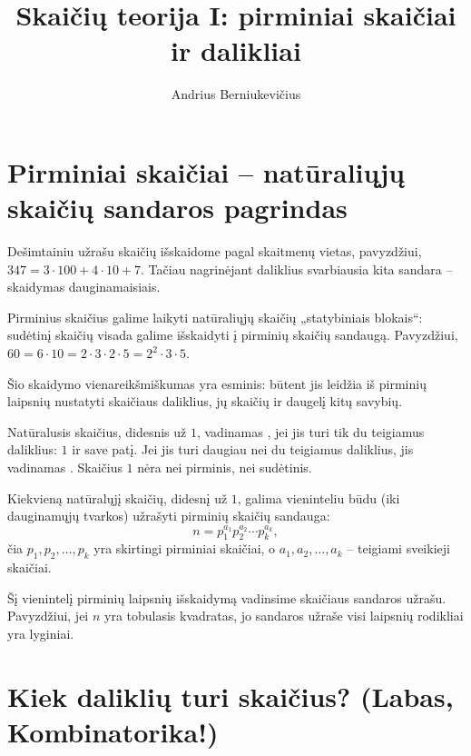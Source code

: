 \documentclass[11pt,a4paper]{scrartcl}
\title{Skaičių teorija I: pirminiai skaičiai ir dalikliai}
\author{Andrius Berniukevičius}
\begin{document}
\maketitle

\section{Pirminiai skaičiai – natūraliųjų skaičių sandaros pagrindas}

Dešimtainiu užrašu skaičių išskaidome pagal skaitmenų vietas, pavyzdžiui, $347=3\cdot100+4\cdot10+7$. Tačiau nagrinėjant daliklius svarbiausia kita sandara – skaidymas dauginamaisiais.

Pirminius skaičius galime laikyti natūraliųjų skaičių „statybiniais blokais“: sudėtinį skaičių visada galime išskaidyti į pirminių skaičių sandaugą. Pavyzdžiui, $60=6\cdot10=2\cdot3\cdot2\cdot5=2^2\cdot3\cdot5$.

Šio skaidymo vienareikšmiškumas yra esminis: būtent jis leidžia iš pirminių laipsnių nustatyti skaičiaus daliklius, jų skaičių ir daugelį kitų savybių.

\begin{definition*}
Natūralusis skaičius, didesnis už $1$, vadinamas , jei jis turi tik du teigiamus daliklius: $1$ ir save patį. Jei jis turi daugiau nei du teigiamus daliklius, jis vadinamas . Skaičius $1$ nėra nei pirminis, nei sudėtinis.
\end{definition*}

\begin{proposition}
Kiekvieną natūralųjį skaičių, didesnį už $1$, galima vieninteliu būdu (iki dauginamųjų tvarkos) užrašyti pirminių skaičių sandauga:
\[
    n=p_1^{a_1}p_2^{a_2}\cdots p_k^{a_k},
\]
čia $p_1,p_2,\ldots,p_k$ yra skirtingi pirminiai skaičiai, o $a_1,a_2,\ldots,a_k$ – teigiami sveikieji skaičiai.
\end{proposition}

\begin{remark*}
Šį vienintelį pirminių laipsnių išskaidymą vadinsime skaičiaus sandaros užrašu. Pavyzdžiui, jei $n$ yra tobulasis kvadratas, jo sandaros užraše visi laipsnių rodikliai yra lyginiai.
\end{remark*}

\section{Kiek daliklių turi skaičius? (Labas, Kombinatorika!)}
\end{document}
